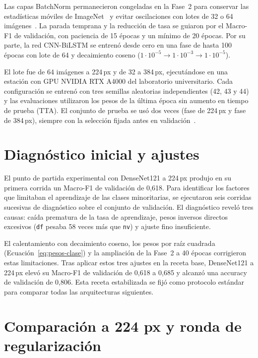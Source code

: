 Las capas BatchNorm permanecieron congeladas en la Fase~2 para conservar las estadísticas móviles de ImageNet~\cite{deng2009imagenet} y evitar oscilaciones con lotes de 32 o 64 imágenes~\cite{zhang2024dive}. La parada temprana y la reducción de tasa se guiaron por el Macro-F1 de validación, con paciencia de 15 épocas y un mínimo de 20 épocas. Por su parte, la red CNN-BiLSTM se entrenó desde cero en una fase de hasta 100 épocas con lote de 64 y decaimiento coseno ($1 \cdot 10^{-5} \to 1 \cdot 10^{-3} \to 1 \cdot 10^{-5}$).

El lote fue de 64 imágenes a 224\,px y de 32 a 384\,px, ejecutándose en una estación con GPU NVIDIA RTX A4000 del laboratorio universitario. Cada configuración se entrenó con tres semillas aleatorias independientes (42, 43 y 44) y las evaluaciones utilizaron los pesos de la última época sin aumento en tiempo de prueba (TTA). El conjunto de prueba se usó dos veces (fase de 224\,px y fase de 384\,px), siempre con la selección fijada antes en validación~\cite{kapoor2023leakage}.

\section{Diagnóstico inicial y ajustes}

El punto de partida experimental con DenseNet121 a 224\,px produjo en su primera corrida un Macro-F1 de validación de 0,618. Para identificar los factores que limitaban el aprendizaje de las clases minoritarias, se ejecutaron seis corridas sucesivas de diagnóstico sobre el conjunto de validación. El diagnóstico reveló tres causas: caída prematura de la tasa de aprendizaje, pesos inversos directos excesivos (\texttt{df} pesaba 58 veces más que \texttt{nv}) y ajuste fino insuficiente.

El calentamiento con decaimiento coseno, los pesos por raíz cuadrada (Ecuación~\ref{eq:pesos-clase}) y la ampliación de la Fase~2 a 40 épocas corrigieron estas limitaciones. Tras aplicar estos tres ajustes en la receta base, DenseNet121 a 224\,px elevó su Macro-F1 de validación de 0,618 a 0,685 y alcanzó una accuracy de validación de 0,806. Esta receta estabilizada se fijó como protocolo estándar para comparar todas las arquitecturas siguientes.

\section{Comparación a 224 px y ronda de regularización}

